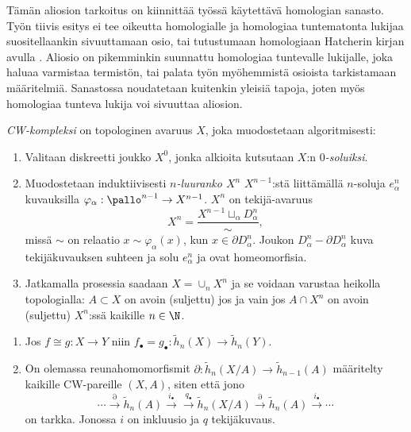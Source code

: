 Tämän aliosion tarkoitus on kiinnittää työssä käytettävä homologian sanasto. Työn tiivis esitys ei tee oikeutta homologialle ja homologiaa tuntematonta lukijaa suositellaankin sivuuttamaan osio, tai tutustumaan homologiaan Hatcherin kirjan avulla \citep{Hatcher2002}. Aliosio on pikemminkin suunnattu homologiaa tuntevalle lukijalle, joka haluaa varmistaa termistön, tai palata työn myöhemmistä osioista tarkistamaan määritelmiä. Sanastossa noudatetaan kuitenkin yleisiä tapoja, joten myös homologiaa tunteva lukija voi sivuuttaa aliosion.
\begin{maaritelma}
    \emph{CW-kompleksi} on topologinen avaruus $X$, joka muodostetaan algoritmisesti:
    \begin{enumerate}
        \item Valitaan diskreetti joukko $X^0$, jonka alkioita kutsutaan $X$:n \emph{$0$-soluiksi}.
        \item Muodostetaan induktiivisesti \emph{$n$-luuranko $X^n$} $X^{n-1}$:stä liittämällä $n$-soluja $e_\alpha^n$ kuvauksilla $\varphi_\alpha:\pallo^{n-1}\to X^{n-1}$. $X^n$ on tekijä-avaruus
        \begin{equation}
            X^n=\frac{X^{n-1}\sqcup_\alpha D_\alpha^n}{\sim},
        \end{equation}
        missä $\sim$ on relaatio $x\sim\varphi_\alpha(x)$, kun $x\in\partial D_\alpha^n$. Joukon $D_\alpha^n-\partial D_\alpha^n$ kuva tekijäkuvauksen suhteen ja solu $e_\alpha^n$ ja ovat homeomorfisia.
        \item Jatkamalla prosessia saadaan $X=\cup_n X^n$ ja se voidaan varustaa heikolla topologialla: $A\subset X$ on avoin (suljettu) jos ja vain jos $A\cap X^n$ on avoin (suljettu) $X^n$:ssä kaikille $n\in\N$. 
    \end{enumerate}
\end{maaritelma}
\begin{aksiooma}
    \begin{enumerate}
        \item Jos $f\cong g:X\to Y$ niin $f_\bullet=g_\bullet:\tilde h_n(X)\to\tilde h_n(Y)$.
        \item On olemassa reunahomomorfismit $\partial:\tilde h_n(X/A)\to\tilde h_{n-1}(A)$ määritelty kaikille CW-pareille $(X,A)$, siten että jono
        \begin{equation}
            \cdots\xrightarrow{\partial}\tilde h_n(A)\xrightarrow{i_\bullet}\xrightarrow{q_\bullet}\tilde h_n(X/A)\xrightarrow{\partial}\tilde h_n(A)\xrightarrow{i_\bullet}\cdots
        \end{equation}
        on tarkka. Jonossa $i$ on inkluusio ja $q$ tekijäkuvaus.
    \end{enumerate}
\end{aksiooma}
